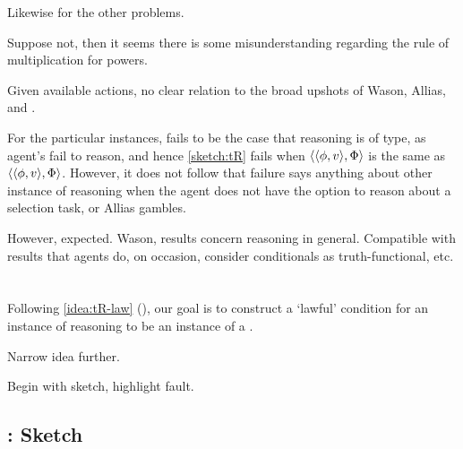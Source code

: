 \begin{note}
\begin{illustration}[Textbook]
    Likewise for the other problems.
  \end{illustration}

  Suppose not, then it seems there is some misunderstanding regarding the rule of multiplication for powers.
\end{note}

\begin{note}
  Given available actions, no clear relation to the broad upshots of Wason, Allias, and \citeauthor{Harman:1984aa}.

  For the particular instances, fails to be the case that reasoning is of type, as agent's fail to reason, and hence \autoref{sketch:tR} fails when \(\langle \langle \phi, v \rangle, \Phi \rangle\) is the same as \(\langle \langle \phi, v \rangle, \Phi \rangle\).
  However, it does not follow that failure says anything about other instance of reasoning when the agent does not have the option to reason about a selection task, or Allias gambles.

  However, expected.
  Wason, results concern reasoning in general.
  Compatible with results that agents do, on occasion, consider conditionals as truth-functional, etc.
\end{note}

\section{}
\label{cha:typical:sec:tR}

\begin{note}
  Following \autoref{idea:tR-law} (), our goal is to construct a `lawful' condition for an instance of reasoning to be an instance of a \torN{}.
\end{note}

\begin{note}
  Narrow idea further.
\end{note}

\begin{note}
  Begin with sketch, highlight fault.
\end{note}



\subsection{: Sketch}
\label{cha:typical:sec:tR:tRSketch}

